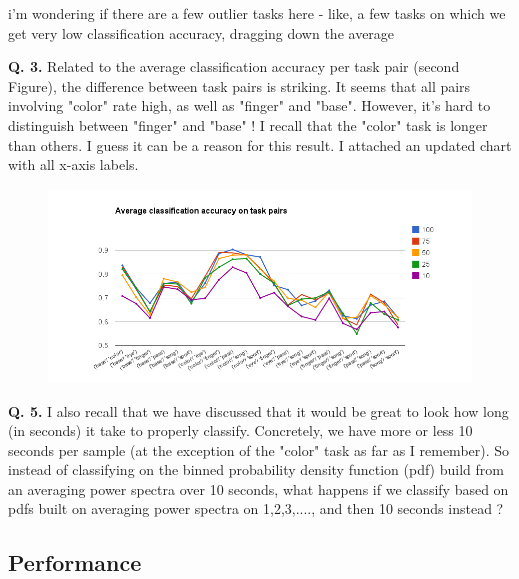 i'm wondering if there are a few outlier tasks here - like, a few tasks on which we get very low classification accuracy, dragging down the average
 

{\bf Q. 3.} Related to the average classification accuracy per task pair (second Figure), the difference between task pairs is striking. It seems that all pairs involving "color" rate high, as well as "finger" and "base". However, it's hard to distinguish between "finger" and "base" ! I recall that the "color" task is longer than others. I guess it can be a reason for this result. I attached an updated chart with all x-axis labels.

\begin{figure}
\begin{center}
\includegraphics[width=6in]{Figures/avg_classification_accuracy_taskpairs.png}
\caption{ }
\label{ }
\end{center}
\end{figure}


{\bf Q. 5.} I also recall that we have discussed that it would be great to look how long (in seconds) it take to properly classify. Concretely, we have more or less 10 seconds per sample (at the exception of the "color" task as far as I remember). So instead of classifying on the binned probability density function (pdf) build from an averaging power spectra over 10 seconds, what happens if we classify based on pdfs built on averaging power spectra on 1,2,3,...., and then 10 seconds instead ?




\subsection{Performance}



